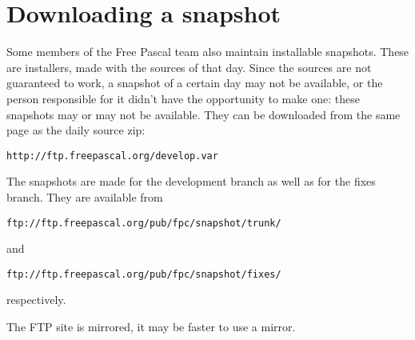 \section{Downloading a snapshot}
Some members of the Free Pascal team also maintain installable snapshots.
These are installers, made with the sources of that day. Since the sources
are not guaranteed to work, a snapshot of a certain day may not be
available, or the person responsible for it didn't have the opportunity to
make one: these snapshots may or may not be available. They can be
downloaded from the same page as the daily source zip:
\begin{verbatim}
http://ftp.freepascal.org/develop.var
\end{verbatim}
The snapshots are made for the development branch as well as for the fixes
branch. They are available from
\begin{verbatim}
ftp://ftp.freepascal.org/pub/fpc/snapshot/trunk/
\end{verbatim}
and
\begin{verbatim}
ftp://ftp.freepascal.org/pub/fpc/snapshot/fixes/
\end{verbatim}
respectively.

The FTP site is mirrored, it may be faster to use a mirror.

\printindex[msgnr]

\printindex[msgtxt]


